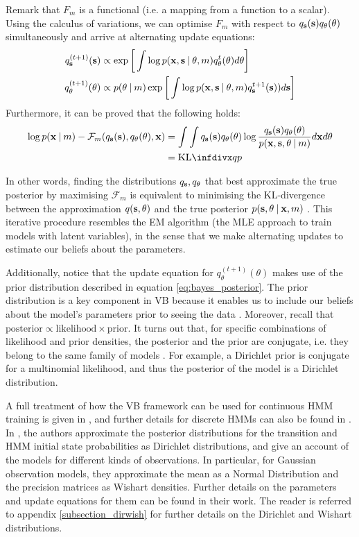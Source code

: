 \documentclass[../main.tex]{subfiles}
\begin{document}
Remark that $F_m$ is a functional (i.e. a mapping from a function to a scalar). Using the calculus of variations, we can optimise $F_m$ with respect to $q_{\mathbf{s}}(\mathbf{s})q_{\theta}(\theta)$ simultaneously and arrive at alternating update equations:
\begin{align*}
q_{\mathbf{s}}^{(t+1)}(\mathbf{s}) &\propto \exp{ \bigg[ \int \log{p(\mathbf{x}, \mathbf{s} \:\vert\: \theta, m)} q_\theta^t(\theta) d\theta \bigg] } \\
q_{\theta}^{(t+1)}(\theta) &\propto p(\theta \:\vert\: m) \exp{\bigg[ \int \log{p(\mathbf{x}, \mathbf{s} \:\vert\: \theta, m)} q_{\mathbf{s}}^{t+1}(\mathbf{s}))d\mathbf{s} \bigg]}
\end{align*}
Furthermore, it can be proved that the following holds:
\begin{align*}
\log{p(\V{x} \given m)} - \mathcal{F}_m(q_{\V{s}}(\V{s}), q_{\theta}(\theta), \V{x}) &= \int\int q_{\V{s}}(\V{s})q_{\theta}(\theta)\log{\frac{q_{\V{s}}(\V{s})q_{\theta}(\theta)}{p(\V{x}, \V{s}, \theta \given m)}} d\V{x} d\theta\\ &= \text{KL}\infdiv{q}{p}
\end{align*}
\par In other words, finding the distributions $q_{\mathbf{s}}, q_\theta$ that best approximate the true posterior by maximising $\mathcal{F}_m$ is equivalent to minimising the KL-divergence between the approximation $q(\mathbf{s}, \theta)$ and the true posterior $p(\mathbf{s}, \theta \:\vert\: \mathbf{x}, m)$ \cite{Ghahramani2003}. This iterative procedure resembles the EM algorithm (the MLE approach to train models with latent variables), in the sense that we make alternating updates to estimate our beliefs about the parameters.
\par Additionally, notice that the update equation for $q_{\theta}^{(t+1)}(\theta)$ makes use of the prior distribution described in equation \ref{eq:bayes_posterior}. The prior distribution is a key component in VB because it enables us to include our beliefs about the model's parameters prior to seeing the data \cite{Genovese2004}. Moreover, recall that $\text{posterior} \propto \text{likelihood} \times \text{prior}$. It turns out that, for specific combinations of likelihood and prior densities, the posterior and the prior are conjugate, i.e. they belong to the same family of models \cite{Rezek2005}. For example, a Dirichlet prior is conjugate for a multinomial likelihood, and thus the posterior of the model is a Dirichlet distribution. 
\par A full treatment of how the VB framework can be used for continuous HMM training is given in \cite{Rezek2005}, and further details for discrete HMMs can also be found in \cite{Beal2001,MacKay1997}. In \cite{Rezek2005}, the authors approximate the posterior distributions for the transition and HMM initial state probabilities as Dirichlet distributions, and give an account of the models for different kinds of observations. In particular, for Gaussian observation models, they approximate the mean as a Normal Distribution and the precision matrices as Wishart densities. Further details on the parameters and update equations for them can be found in their work. The reader is referred to appendix \ref{subsection_dirwish} for further details on the Dirichlet and Wishart distributions.
\end{document}
